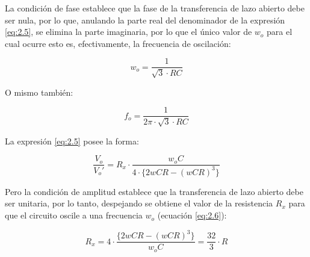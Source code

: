 La condición de fase establece que la fase de la transferencia de lazo abierto debe ser nula, por lo que, anulando la parte real del denominador de la expresión \ref{eq:2.5}, se elimina la parte imaginaria, por lo que el único valor de $w_o$ para el cual ocurre esto es, efectivamente, la frecuencia de oscilación:

\begin{equation}
\label{eq:2.6}
w_o = \frac{1}{\sqrt{3}\cdot RC}
\end{equation}

O mismo también:

\begin{equation}
\label{eq:2.7}
f_o = \frac{1}{2\pi \cdot \sqrt{3}\cdot RC}
\end{equation}

La expresión \ref{eq:2.5} posee la forma: 

\begin{equation}
\label{eq:2.8}
\frac{V_o}{V_o'} =R_x \cdot \frac{w_oC}{4\cdot \{2wCR-(wCR)^3\}}
\end{equation}

Pero la condición de amplitud establece que la transferencia de lazo abierto debe ser unitaria, por lo tanto, despejando se obtiene el valor de la resistencia $R_x$ para que el circuito oscile a una frecuencia $w_o$ (ecuación \ref{eq:2.6}):

\begin{equation}
\label{eq:2.9}
R_x = 4 \cdot \frac{\{2wCR-(wCR)^3\}}{w_oC} = \frac{32}{3} \cdot R
\end{equation}